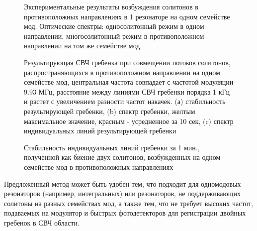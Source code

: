 \begin{figure}[ht]
\begin{minipage}[ht]{1\linewidth}
\end{minipage}
\caption{Экспериментальные результаты возбуждения солитонов в противоположных направлениях в 1 резонаторе на одном семействе мод. Оптические спектры: односолитонный режим в одном направлении, многосолитонный режим в противоположном направлении на том же семействе мод.}
\label{cp_one_family}
\end{figure}

\begin{figure}[ht]
\begin{minipage}[ht]{1\linewidth}
\end{minipage}
\caption{Результирующая СВЧ гребенка при совмещении потоков солитонов, распространяющихся в противоположном направлении на одном семействе мод, центральная частота совпадает с частотой модуляции 9.93 МГц, расстояние между линиями СВЧ гребенки порядка 1 кГц и растет с увеличением разности частот накачек. (а) стабильность результирующей гребенки, (b) спектр гребенки, желтым максимальное значение, красным - усредненное за 10 сек, (c) спектр индивидуальных линий результирующей гребенки}
\label{cp_one_family_dual_comb}
\end{figure}

\begin{figure}[ht]
\begin{minipage}[ht]{1\linewidth}
\end{minipage}
\caption{Стабильность индивидуальных линий гребенки за 1 мин., полученной как биение двух солитонов, возбужденных на одном семействе мод в противоположных направлениях}
\label{cp_one_family_stability}
\end{figure}

Предложенный метод может быть удобен тем, что подходит для одномодовых резонаторов (например, интегральных) или резонаторов, не поддерживающих солитоны на разных семействах мод, а также тем, что не требует высоких частот, подаваемых на модулятор и быстрых фотодетекторов для регистрации двойных гребенок в СВЧ области.

